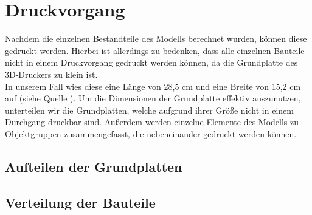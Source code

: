 \section{Druckvorgang}
Nachdem die einzelnen Bestandteile des Modells berechnet wurden, können diese gedruckt werden.
Hierbei ist allerdings zu bedenken, dass alle einzelnen Bauteile nicht in einem Druckvorgang gedruckt werden können, da die Grundplatte des 3D-Druckers zu klein ist. \\
In unserem Fall wies diese eine Länge von 28,5 cm und eine Breite von 15,2 cm auf (siehe Quelle \cite{makerbotspecs}).
Um die Dimensionen der Grundplatte effektiv auszunutzen, unterteilen wir die Grundplatten, welche aufgrund ihrer Größe nicht in einem Durchgang druckbar sind.
Außerdem werden einzelne Elemente des Modells zu Objektgruppen zusammengefasst, die nebeneinander gedruckt werden können.

\subsection{Aufteilen der Grundplatten}

\subsection{Verteilung der Bauteile}

